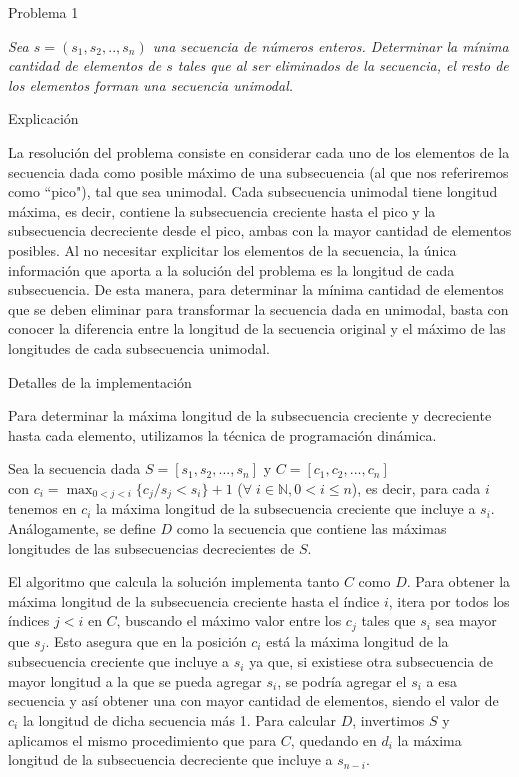 \begin{section}{Problema 1}

	\textit{Sea $s = (s_1,s_2,..,s_n)$ una secuencia de números enteros. Determinar la mínima cantidad de elementos de $s$ tales que al ser eliminados de la secuencia, el resto de los elementos forman una secuencia unimodal.}

	\begin{subsection}{Explicación}

		La resolución del problema consiste en considerar cada uno de los elementos de la secuencia dada como
		posible máximo de una subsecuencia (al que nos referiremos como ``pico"), tal que sea unimodal. Cada 
		subsecuencia unimodal tiene longitud máxima, es decir, contiene la subsecuencia creciente hasta el pico
		y la subsecuencia decreciente desde el pico, ambas con la mayor cantidad de elementos posibles. Al no
		necesitar explicitar los elementos de la secuencia, la única información que aporta a la solución del
		problema es la longitud de cada subsecuencia. De esta manera, para determinar la mínima cantidad de
		elementos que se deben eliminar para transformar la secuencia dada en unimodal, basta con conocer
		la diferencia entre la longitud de la secuencia original y el máximo de las longitudes de cada
		subsecuencia unimodal. 		

	\end{subsection}

	\newpage

	\begin{subsection}{Detalles de la implementación}
		
		Para determinar la máxima longitud de la subsecuencia creciente y decreciente hasta cada elemento,
		utilizamos la técnica de programación dinámica.
		
		Sea la secuencia dada $S=[s_1,s_2,...,s_n]$ y $C=[c_1,c_2,...,c_n]$ \\
		con $c_i=\displaystyle\max_{0<j<i}\{ c_j / s_j < s_i \}+1$ ($\forall\;i\in\mathbb{N}, 0<i\leq n$), es 
		decir, para cada $i$ tenemos en $c_i$ la máxima longitud de la subsecuencia creciente que incluye a
		$s_i$. Análogamente, se define $D$ como la secuencia que contiene las máximas longitudes de las
		subsecuencias decrecientes de $S$.
		
		El algoritmo que calcula la solución implementa tanto $C$ como $D$.	
		Para obtener la máxima longitud de la subsecuencia creciente hasta el índice $i$, itera
		por todos los índices $j<i$ en $C$, buscando el máximo valor entre los $c_j$ tales que $s_i$ sea mayor
		que	$s_j$. 
		Esto asegura que en la posición $c_i$ está la máxima longitud de la subsecuencia creciente
		que incluye a $s_i$ ya que, si existiese otra subsecuencia de mayor longitud a la que se pueda 
		agregar $s_i$, se podría agregar el $s_i$ a esa secuencia y así obtener una con mayor cantidad de 
		elementos, siendo el valor de $c_i$ la longitud de dicha secuencia más 1. Para calcular $D$,
		invertimos $S$ y aplicamos el mismo	procedimiento que para $C$, quedando en $d_i$ la máxima longitud
		de la subsecuencia decreciente que incluye a $s_{n-i}$.


\end{subsection}
\end{section}
